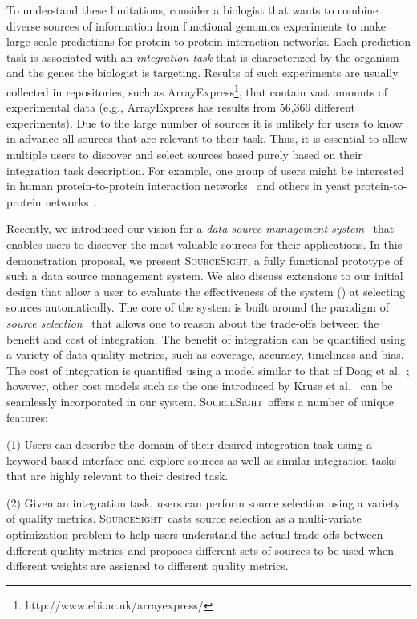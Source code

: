 \documentclass{vldb}
\newcommand\system{\textsc{SourceSight}}
\begin{document}
To understand these limitations, consider a biologist that wants to combine diverse sources of information from functional genomics experiments to make large-scale predictions for protein-to-protein interaction networks. Each prediction task is associated with an {\em integration task} that is characterized by the organism and the genes the biologist is targeting. Results of such experiments are usually collected in repositories, such as ArrayExpress\footnote{http://www.ebi.ac.uk/arrayexpress/}, that contain vast amounts of experimental data (e.g., ArrayExpress has results from 56,369 different experiments). Due to the large number of sources it is unlikely for users to know in advance all sources that are relevant to their task. Thus, it is essential to allow multiple users to discover and select sources based purely based on their integration task description. For example, one group of users might be interested in human protein-to-protein interaction networks~\cite{humanpp} and others in yeast protein-to-protein networks~\cite{yeastpp}.

Recently, we introduced our vision for a {\em data source management system}~\cite{rekatsinas:2015} that enables users to discover the most valuable sources for their applications. In this demonstration proposal, we present \system, a fully functional prototype of such a data source management system. We also discuss extensions to our initial design that allow a user to evaluate the effectiveness of the system () at selecting sources automatically. The core of the system is built around the paradigm of {\em source selection}~\cite{dong:vldb13} that allows one to reason about the trade-offs between the benefit and cost of integration. The benefit of integration can be quantified using a variety of data quality metrics, such as coverage, accuracy, timeliness and bias. The cost of integration is quantified using a model similar to that of Dong et al.~\cite{dong:vldb13}; however, other cost models such as the one introduced by Kruse et al.~\cite{kruse2015estimating} can be seamlessly incorporated in our system. \system~offers a number of unique features:

\vspace{2pt}\noindent (1) Users can describe the domain of their desired integration task using a keyword-based interface and explore sources as well as similar integration tasks that are highly relevant to their desired task.

\vspace{2pt}\noindent (2) Given an integration task, users can perform source selection using a variety of quality metrics. \system~casts source selection as a multi-variate optimization problem to help users understand the actual trade-offs between different quality metrics and proposes different sets of sources to be used when different weights are assigned to different quality metrics. 
\end{document}
